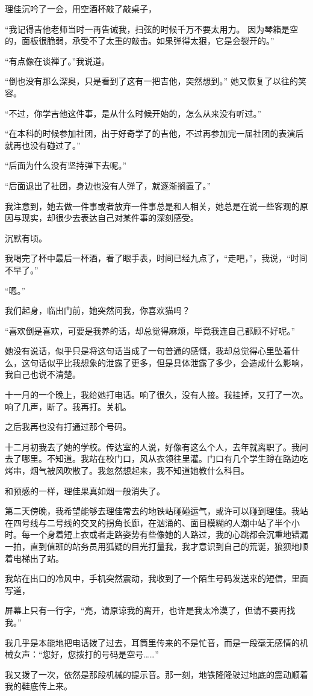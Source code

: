 理佳沉吟了一会，用空酒杯敲了敲桌子，

“我记得吉他老师当时一再告诫我，扫弦的时候千万不要太用力。 因为琴箱是空的，面板很脆弱，承受不了太重的敲击。如果弹得太狠，它是会裂开的。”

“有点像在谈禅了。”我说道。

“倒也没有那么深奥，只是看到了这有一把吉他，突然想到。” 她又恢复了以往的笑容。

“不过，你学吉他这件事，是从什么时候开始的，怎么从来没有听过。”

“在本科的时候参加社团，出于好奇学了的吉他，不过再参加完一届社团的表演后就再也没有碰过了。”

“后面为什么没有坚持弹下去呢。”

“后面退出了社团，身边也没有人弹了，就逐渐搁置了。”

我注意到，她去做一件事或者放弃一件事总是和人相关，她总是在说一些客观的原因与现实，却很少去表达自己对某件事的深刻感受。

沉默有顷。

我喝完了杯中最后一杯酒，看了眼手表，时间已经九点了，“走吧，”，我说，“时间不早了。”

“嗯。”

我们起身，临出门前，她突然问我，你喜欢猫吗？

“喜欢倒是喜欢，可要是我养的话，却总觉得麻烦，毕竟我连自己都顾不好呢。”

她没有说话，似乎只是将这句话当成了一句普通的感慨，我却总觉得心里坠着什么，这句话似乎比我想象的泄露了更多，但是具体泄露了多少，会造成什么影响，我自己也说不清楚。

十一月的一个晚上，我给她打电话。响了很久，没有人接。我挂掉，又打了一次。响了几声，断了。我再打。关机。

之后我再也没有打通过那个号码。

十二月初我去了她的学校。传达室的人说，好像有这么个人，去年就离职了。我问去了哪里。不知道。我站在校门口，风从衣领往里灌。门口有几个学生蹲在路边吃烤串，烟气被风吹散了。我忽然想起来，我不知道她教什么科目。

和预感的一样，理佳果真如烟一般消失了。

第二天傍晚，我希望能够去理佳常去的地铁站碰碰运气，或许可以碰到理佳。我站在四号线与二号线的交叉的拐角长廊，在汹涌的、面目模糊的人潮中站了半个小时。每一个身着短上衣或者走路姿势有些像她的人路过，我的心跳都会沉重地错漏一拍，直到值班的站务员用狐疑的目光打量我，我才意识到自己的荒诞，狼狈地顺着电梯出了站。

我站在出口的冷风中，手机突然震动，我收到了一个陌生号码发送来的短信，里面写道，

屏幕上只有一行字，“亮，请原谅我的离开，也许是我太冷漠了，但请不要再找我。”

我几乎是本能地把电话拨了过去，耳筒里传来的不是忙音，而是一段毫无感情的机械女声：“您好，您拨打的号码是空号……”

我又拨了一次，依然是那段机械的提示音。那一刻，地铁隆隆驶过地底的震动顺着我的鞋底传上来。
